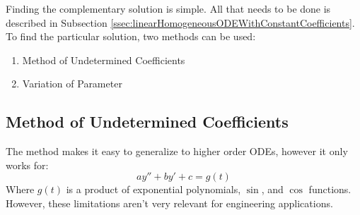 \documentclass[12pt]{article}
\begin{document}
%
%
%

Finding the complementary solution is simple. All that needs to be done is described in Subsection \ref{ssec:linearHomogeneousODEWithConstantCoefficients}. To find the particular solution, two methods can be used:
\begin{enumerate}
  \itemsep0em
  \item Method of Undetermined Coefficients
  \item Variation of Parameter
\end{enumerate}

\subsection{Method of Undetermined Coefficients}
\label{ssec:methodOfUndeterminedCoefficients}
The method makes it easy to generalize to higher order ODEs, however it only works for:
\begin{equation*}
  ay'' + by' + c = g(t)
\end{equation*}
Where $g(t)$ is a product of exponential polynomials, $\sin$, and $\cos$ functions. However, these limitations aren't very relevant for engineering applications.
\end{document}
